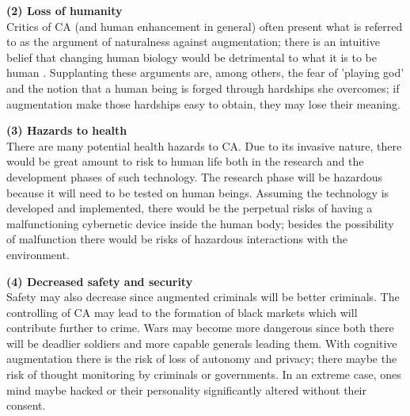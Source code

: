 \textbf{(2) Loss of humanity} \\
Critics of CA (and human enhancement in general) often present what is referred to as the argument of naturalness \cite[pg. 190]{miah2011ethical} against augmentation; there is an intuitive belief that changing human biology would be detrimental to what it is to be human \cite{allhoff2009ethics}. Supplanting these arguments are, among others, the fear of 'playing god' and the notion that a human being is forged through hardships she overcomes; if augmentation make those hardships easy to obtain, they may lose their meaning.


\textbf{(3) Hazards to health} \\
There are many potential health hazards to CA. Due to its invasive nature, there would be great amount to risk to human life both in the research and the development phases of such technology. The research phase will be hazardous because it will need to be tested on human beings. Assuming the technology is developed and implemented, there would be the perpetual risks of having a malfunctioning cybernetic device inside the human body; besides the possibility of malfunction there would be risks of hazardous interactions with the environment.


\textbf{(4) Decreased safety and security} \\
Safety may also decrease since augmented criminals will be better criminals. The controlling of CA may lead to the formation of black markets which will contribute further to crime. Wars may become more dangerous since both there will be deadlier soldiers and more capable generals leading them. With cognitive augmentation there is the risk of loss of autonomy and privacy; there maybe the risk of thought monitoring by criminals or governments. In an extreme case, ones mind maybe hacked or their personality significantly altered without their consent.


